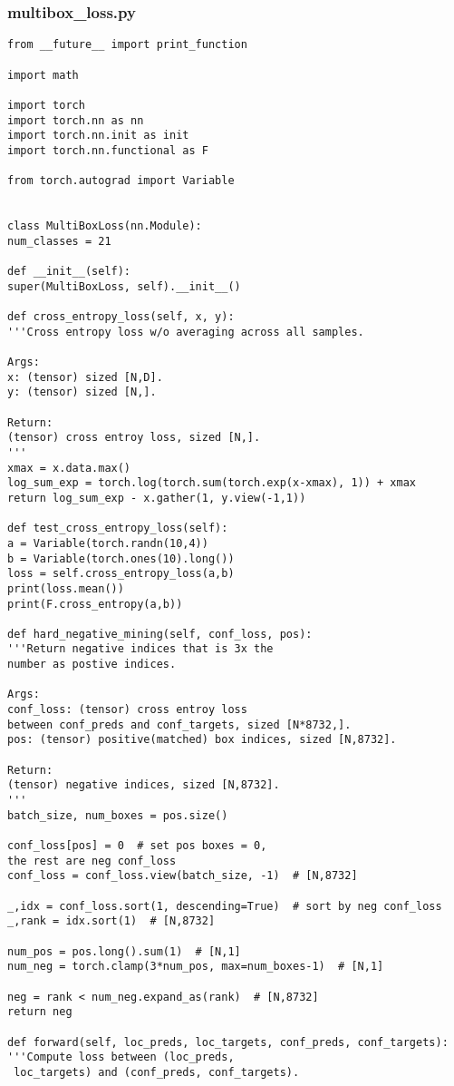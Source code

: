 \subsubsection*{multibox\_loss.py}
\begin{lstlisting}
from __future__ import print_function

import math

import torch
import torch.nn as nn
import torch.nn.init as init
import torch.nn.functional as F

from torch.autograd import Variable


class MultiBoxLoss(nn.Module):
num_classes = 21

def __init__(self):
super(MultiBoxLoss, self).__init__()

def cross_entropy_loss(self, x, y):
'''Cross entropy loss w/o averaging across all samples.

Args:
x: (tensor) sized [N,D].
y: (tensor) sized [N,].

Return:
(tensor) cross entroy loss, sized [N,].
'''
xmax = x.data.max()
log_sum_exp = torch.log(torch.sum(torch.exp(x-xmax), 1)) + xmax
return log_sum_exp - x.gather(1, y.view(-1,1))

def test_cross_entropy_loss(self):
a = Variable(torch.randn(10,4))
b = Variable(torch.ones(10).long())
loss = self.cross_entropy_loss(a,b)
print(loss.mean())
print(F.cross_entropy(a,b))

def hard_negative_mining(self, conf_loss, pos):
'''Return negative indices that is 3x the 
number as postive indices.

Args:
conf_loss: (tensor) cross entroy loss 
between conf_preds and conf_targets, sized [N*8732,].
pos: (tensor) positive(matched) box indices, sized [N,8732].

Return:
(tensor) negative indices, sized [N,8732].
'''
batch_size, num_boxes = pos.size()

conf_loss[pos] = 0  # set pos boxes = 0, 
the rest are neg conf_loss
conf_loss = conf_loss.view(batch_size, -1)  # [N,8732]

_,idx = conf_loss.sort(1, descending=True)  # sort by neg conf_loss
_,rank = idx.sort(1)  # [N,8732]

num_pos = pos.long().sum(1)  # [N,1]
num_neg = torch.clamp(3*num_pos, max=num_boxes-1)  # [N,1]

neg = rank < num_neg.expand_as(rank)  # [N,8732]
return neg

def forward(self, loc_preds, loc_targets, conf_preds, conf_targets):
'''Compute loss between (loc_preds,
 loc_targets) and (conf_preds, conf_targets).


\end{lstlisting}
